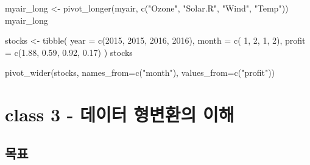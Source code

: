 \documentclass[
]{book}
\newenvironment{Shaded}{\begin{snugshade}}{\end{snugshade}}
\newcommand{\AttributeTok}[1]{\textcolor[rgb]{0.77,0.63,0.00}{#1}}
\newcommand{\DecValTok}[1]{\textcolor[rgb]{0.00,0.00,0.81}{#1}}
\newcommand{\FloatTok}[1]{\textcolor[rgb]{0.00,0.00,0.81}{#1}}
\newcommand{\FunctionTok}[1]{\textcolor[rgb]{0.00,0.00,0.00}{#1}}
\newcommand{\NormalTok}[1]{#1}
\newcommand{\OtherTok}[1]{\textcolor[rgb]{0.56,0.35,0.01}{#1}}
\newcommand{\StringTok}[1]{\textcolor[rgb]{0.31,0.60,0.02}{#1}}
\begin{document}
\begin{Shaded}
\begin{Highlighting}[]
\NormalTok{myair\_long }\OtherTok{\textless{}{-}} \FunctionTok{pivot\_longer}\NormalTok{(myair, }\FunctionTok{c}\NormalTok{(}\StringTok{"Ozone"}\NormalTok{, }\StringTok{"Solar.R"}\NormalTok{, }\StringTok{"Wind"}\NormalTok{, }\StringTok{"Temp"}\NormalTok{))}
\NormalTok{myair\_long}
\end{Highlighting}
\end{Shaded}

\begin{Shaded}
\begin{Highlighting}[]
\NormalTok{stocks }\OtherTok{\textless{}{-}} \FunctionTok{tibble}\NormalTok{(}
  \AttributeTok{year   =} \FunctionTok{c}\NormalTok{(}\DecValTok{2015}\NormalTok{, }\DecValTok{2015}\NormalTok{, }\DecValTok{2016}\NormalTok{, }\DecValTok{2016}\NormalTok{),}
  \AttributeTok{month  =} \FunctionTok{c}\NormalTok{(   }\DecValTok{1}\NormalTok{,    }\DecValTok{2}\NormalTok{,     }\DecValTok{1}\NormalTok{,    }\DecValTok{2}\NormalTok{),}
  \AttributeTok{profit =} \FunctionTok{c}\NormalTok{(}\FloatTok{1.88}\NormalTok{, }\FloatTok{0.59}\NormalTok{, }\FloatTok{0.92}\NormalTok{, }\FloatTok{0.17}\NormalTok{)}
\NormalTok{)}
\NormalTok{stocks}
\end{Highlighting}
\end{Shaded}

\begin{Shaded}
\begin{Highlighting}[]
\FunctionTok{pivot\_wider}\NormalTok{(stocks, }\AttributeTok{names\_from=}\FunctionTok{c}\NormalTok{(}\StringTok{"month"}\NormalTok{), }\AttributeTok{values\_from=}\FunctionTok{c}\NormalTok{(}\StringTok{"profit"}\NormalTok{))}
\end{Highlighting}
\end{Shaded}

\hypertarget{class-3---uxb370uxc774uxd130-uxd615uxbcc0uxd658uxc758-uxc774uxd574}{%
\section{class 3 - 데이터 형변환의 이해}\label{class-3---uxb370uxc774uxd130-uxd615uxbcc0uxd658uxc758-uxc774uxd574}}

\hypertarget{uxbaa9uxd45c-2}{%
\subsection{목표}\label{uxbaa9uxd45c-2}}
\end{document}
